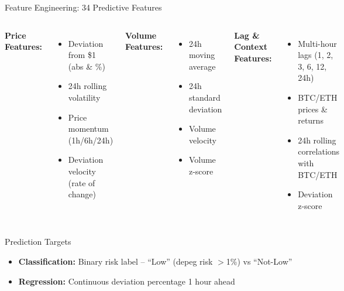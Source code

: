 \documentclass[aspectratio=169]{beamer}
\begin{document}
\begin{frame}{Feature Engineering: 34 Predictive Features}
\begin{columns}[t]
\textbf{Price Features:}
\begin{itemize}
    \item Deviation from \$1 (abs \& \%)
    \item 24h rolling volatility
    \item Price momentum (1h/6h/24h)
    \item Deviation velocity (rate of change)
\end{itemize}

\textbf{Volume Features:}
\begin{itemize}
    \item 24h moving average
    \item 24h standard deviation
    \item Volume velocity
    \item Volume z-score
\end{itemize}

\textbf{Lag \& Context Features:}
\begin{itemize}
    \item Multi-hour lags (1, 2, 3, 6, 12, 24h)
    \item BTC/ETH prices \& returns
    \item 24h rolling correlations with BTC/ETH
    \item Deviation z-score
\end{itemize}
\end{columns}

\vspace{0.5cm}
\begin{block}{Prediction Targets}
\begin{itemize}
    \item \textbf{Classification:} Binary risk label -- ``Low'' (depeg risk $>$1\%) vs ``Not-Low''
    \item \textbf{Regression:} Continuous deviation percentage 1 hour ahead
\end{itemize}
\end{block}
\end{frame}
\end{document}
